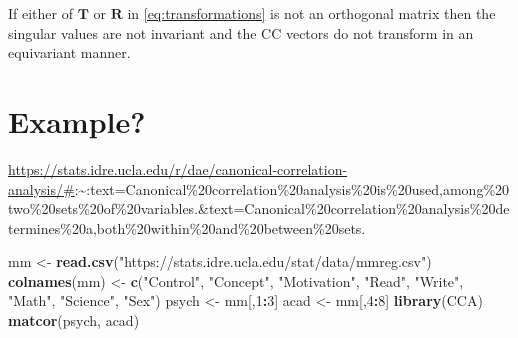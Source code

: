 \documentclass[]{book}
\newenvironment{Shaded}{\begin{snugshade}}{\end{snugshade}}
\newcommand{\DecValTok}[1]{\textcolor[rgb]{0.00,0.00,0.81}{#1}}
\newcommand{\KeywordTok}[1]{\textcolor[rgb]{0.13,0.29,0.53}{\textbf{#1}}}
\newcommand{\NormalTok}[1]{#1}
\newcommand{\OperatorTok}[1]{\textcolor[rgb]{0.81,0.36,0.00}{\textbf{#1}}}
\newcommand{\StringTok}[1]{\textcolor[rgb]{0.31,0.60,0.02}{#1}}
\theoremstyle{definition}
\theoremstyle{definition}
\theoremstyle{definition}
\theoremstyle{remark}
\begin{document}
If either of \(\mathbf T\) or \(\mathbf R\) in \eqref{eq:transformations} is not an orthogonal matrix then the singular values are not invariant and the CC vectors do not transform in an equivariant manner.

\hypertarget{example-1}{%
\section{Example?}\label{example-1}}

\url{https://stats.idre.ucla.edu/r/dae/canonical-correlation-analysis/\#}:\textasciitilde{}:text=Canonical\%20correlation\%20analysis\%20is\%20used,among\%20two\%20sets\%20of\%20variables.\&text=Canonical\%20correlation\%20analysis\%20determines\%20a,both\%20within\%20and\%20between\%20sets.

\begin{Shaded}
\begin{Highlighting}[]
\NormalTok{mm <-}\StringTok{ }\KeywordTok{read.csv}\NormalTok{(}\StringTok{"https://stats.idre.ucla.edu/stat/data/mmreg.csv"}\NormalTok{)}
\KeywordTok{colnames}\NormalTok{(mm) <-}\StringTok{ }\KeywordTok{c}\NormalTok{(}\StringTok{"Control"}\NormalTok{, }\StringTok{"Concept"}\NormalTok{, }\StringTok{"Motivation"}\NormalTok{, }\StringTok{"Read"}\NormalTok{, }\StringTok{"Write"}\NormalTok{, }\StringTok{"Math"}\NormalTok{,}
\StringTok{"Science"}\NormalTok{, }\StringTok{"Sex"}\NormalTok{)}
\NormalTok{psych <-}\StringTok{ }\NormalTok{mm[,}\DecValTok{1}\OperatorTok{:}\DecValTok{3}\NormalTok{]}
\NormalTok{acad <-}\StringTok{ }\NormalTok{mm[,}\DecValTok{4}\OperatorTok{:}\DecValTok{8}\NormalTok{]}
\KeywordTok{library}\NormalTok{(CCA)}
\KeywordTok{matcor}\NormalTok{(psych, acad)}
\end{Highlighting}
\end{Shaded}
\end{document}
